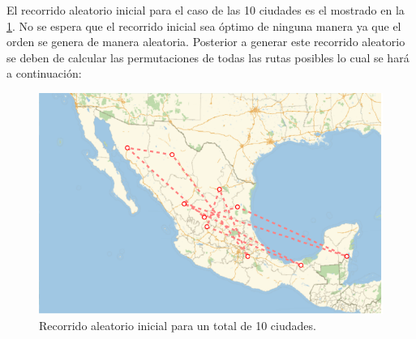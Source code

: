 El recorrido aleatorio inicial para el caso de las 10 ciudades es el mostrado en la \cref{fig:trip_cities_10_init}. No se espera que el recorrido inicial sea óptimo de ninguna manera ya que el orden se genera de manera aleatoria. Posterior a generar este recorrido aleatorio se deben de calcular las permutaciones de todas las rutas posibles lo cual se hará a continuación:
\begin{figure}[ht!]
    \centering
    \includegraphics[scale=0.8]{../figures/trip_cities_10_init.pdf}
    \caption{Recorrido aleatorio inicial para un total de 10 ciudades.}
    \label{fig:trip_cities_10_init}
\end{figure}

